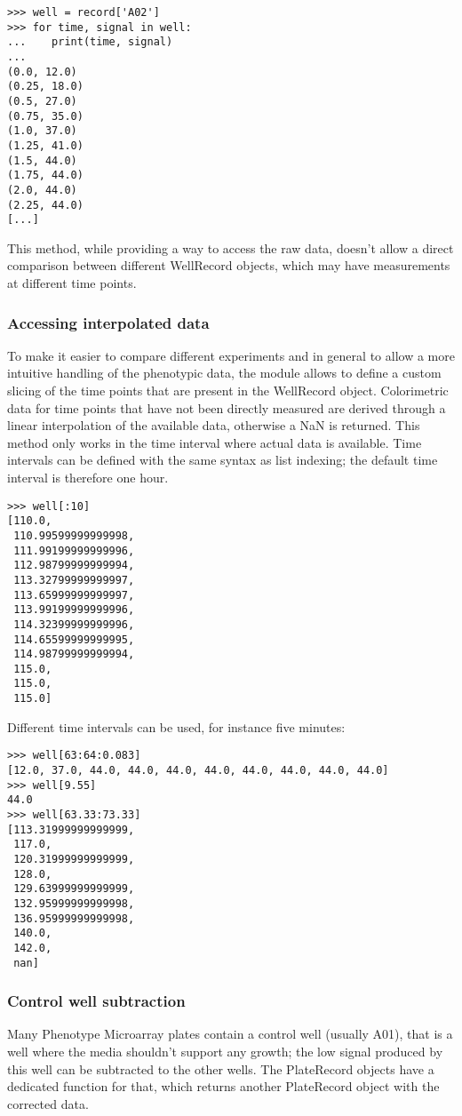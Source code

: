 \begin{verbatim}
>>> well = record['A02']
>>> for time, signal in well:
...    print(time, signal)
...
(0.0, 12.0)
(0.25, 18.0)
(0.5, 27.0)
(0.75, 35.0)
(1.0, 37.0)
(1.25, 41.0)
(1.5, 44.0)
(1.75, 44.0)
(2.0, 44.0)
(2.25, 44.0)
[...]
\end{verbatim}

This method, while providing a way to access the raw data, doesn't allow a direct
comparison between different WellRecord objects, which may have measurements at
different time points.

\subsubsection{Accessing interpolated data}
To make it easier to compare different experiments and in general to allow a more intuitive handling
of the phenotypic data, the module allows to define a custom slicing of the time points that are present
in the WellRecord object. Colorimetric data for time points that have not been directly measured are
derived through a linear interpolation of the available data, otherwise a NaN is returned.
This method only works in the time interval where actual data is available.
Time intervals can be defined with the same syntax as list
indexing; the default time interval is therefore one hour.

\begin{verbatim}
>>> well[:10]
[110.0,
 110.99599999999998,
 111.99199999999996,
 112.98799999999994,
 113.32799999999997,
 113.65999999999997,
 113.99199999999996,
 114.32399999999996,
 114.65599999999995,
 114.98799999999994,
 115.0,
 115.0,
 115.0]
\end{verbatim}

Different time intervals can be used, for instance five minutes:
\begin{verbatim}
>>> well[63:64:0.083]
[12.0, 37.0, 44.0, 44.0, 44.0, 44.0, 44.0, 44.0, 44.0, 44.0]
>>> well[9.55]
44.0
>>> well[63.33:73.33]
[113.31999999999999,
 117.0,
 120.31999999999999,
 128.0,
 129.63999999999999,
 132.95999999999998,
 136.95999999999998,
 140.0,
 142.0,
 nan]
\end{verbatim}

\subsubsection{Control well subtraction}
Many Phenotype Microarray plates contain a control well (usually A01), that is a well where the media shouldn't support
any growth; the low signal produced by this well can be subtracted to the other wells.
The PlateRecord objects have a dedicated function for that, which returns another PlateRecord object
with the corrected data.

